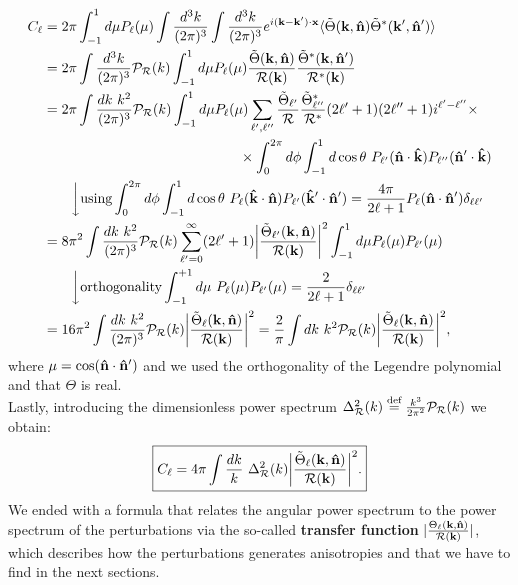 \begin{align}
    C_{\ell}&=2\pi\int_{-1}^{1}d\mu P_{\ell}(\mu)\int\frac{d^3k}{(2\pi)^3}\int\frac{d^3k}{(2\pi)^3}e^{i(\mathbf k-\mathbf k')\cdot \mathbf x}\langle\tilde\Theta(\mathbf k,\versor n)\tilde\Theta^*(\mathbf k',\versor n')\rangle\nonumber\\
    &=2\pi\int\frac{d^3k}{(2\pi)^3}\mathcal P_{\mathcal{R}}(k)\int_{-1}^{1}d\mu P_{\ell}(\mu)\frac{\tilde\Theta(\mathbf{k},\versor n)}{\mathcal{R}(\mathbf{k})}\frac{\tilde\Theta^*(\mathbf{k},\versor n')}{\mathcal{R}^*(\mathbf{k})}\nonumber\\
    &=2\pi\int\frac{dk\ k^2}{(2\pi)^3}\mathcal P_{\mathcal{R}}(k)\int_{-1}^{1}d\mu P_{\ell}(\mu)\sum_{\ell',\ell''}\frac{\tilde\Theta_{\ell'}}{\mathcal{R}}\frac{\tilde\Theta_{\ell''}^*}{\mathcal{R}^*}(2\ell'+1)(2\ell''+1)i^{\ell'-\ell''}\times\nonumber\\
    &\qquad\qquad\qquad\qquad\qquad\qquad\qquad\times\int_0^{2\pi} d\phi \int_{-1}^{1} d\cos\theta\ P_{\ell'}(\versor n\cdot\versor k)P_{\ell''}(\versor n'\cdot\versor k)\nonumber\\
    &\qquad\bigg\downarrow\text{using}\int_0^{2\pi} d\phi \int_{-1}^{1} d\cos\theta\  P_\ell(\versor{k}\cdot\versor n)P_{\ell'}(\versor{k}'\cdot\versor n')=\frac{4\pi}{2\ell+1}P_\ell(\versor n\cdot\versor n')\delta_{\ell\ell'}\nonumber\\
    &=8\pi^2\int \frac{dk\ k^2}{(2\pi)^3}\mathcal{P}_{\mathcal R}(k)\sum_{\ell'=0}^{\infty}(2\ell'+1)\bigg|\frac{\tilde\Theta_{\ell'}(\mathbf k,\versor n)}{\mathcal{R(\mathbf k)}}\bigg|^2\int_{-1}^{1}d\mu P_{\ell}(\mu)P_{\ell'}(\mu)\nonumber\\&\qquad\bigg\downarrow\text{orthogonality}\int_{-1}^{+1}d\mu\ P_\ell(\mu)P_{\ell'}(\mu)=\frac{2}{2\ell+1}\delta_{\ell\ell'}\nonumber\\
    &=16\pi^2\int \frac{dk\ k^2}{(2\pi)^3}\mathcal{P}_{\mathcal R}(k)\bigg|\frac{\tilde\Theta_\ell(\mathbf k,\versor n)}{\mathcal{R(\mathbf k)}}\bigg|^2=\frac{2}{\pi}\int dk\ k^2\mathcal{P}_{\mathcal R}(k)\bigg|\frac{\tilde\Theta_\ell(\mathbf k,\versor n)}{\mathcal{R(\mathbf k)}}\bigg|^2
    ,\label{eq:cl_pert}
\end{align}
where $\mu=\cos(\mathbf{\hat{n}}\cdot\mathbf{\hat{n}}')$ and we used the orthogonality of the Legendre polynomial and that $\Theta$ is real.\\
Lastly, introducing the dimensionless power spectrum $\Delta^2_{\mathcal R}(k)\stackrel{\text{def}}{=}\frac{k^3}{2\pi^2}\mathcal P_{\mathcal R}(k)$ we obtain:
\begin{equation}
   \boxed{ C_{\ell}=4\pi\int \frac{dk}{k}\ \Delta^2_{\mathcal R}(k)\bigg|\frac{\tilde\Theta_\ell(\mathbf k,\mathbf{\hat{n}})}{\mathcal{R(\mathbf k)}}\bigg|^2.}
\end{equation}
We ended with a formula that relates the angular power spectrum to the power spectrum of the perturbations via the so-called \textbf{transfer function} $|\frac{\Theta_\ell(\mathbf k,\mathbf{\hat{n}})}{\mathcal{R(\mathbf k)}}|$, which describes how the perturbations generates anisotropies and that we have to find in the next sections.\\
